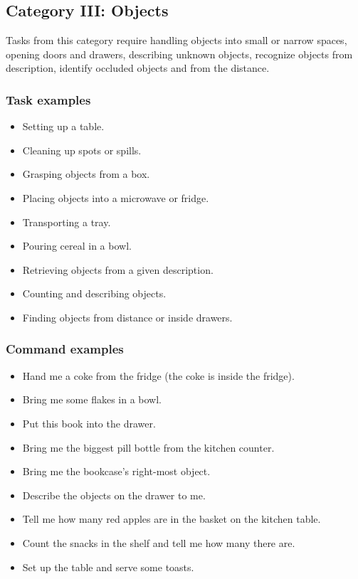 %
%
\subsection{Category III: Objects}
\label{sec:eegpsr-category3-explained}
Tasks from this category require handling objects into small or narrow spaces, opening doors and drawers, describing unknown objects, recognize objects from description, identify occluded objects and from the distance. 

\subsubsection{Task examples}
\begin{itemize}
	\item Setting up a table.
	\item Cleaning up spots or spills.
	\item Grasping objects from a box.
	\item Placing objects into a microwave or fridge.
	\item Transporting a tray.
	\item Pouring cereal in a bowl.
	\item Retrieving objects from a given description.
	\item Counting and describing objects.
	\item Finding objects from distance or inside drawers.
\end{itemize}

\subsubsection{Command examples}
\begin{itemize}
	\item Hand me a coke from the fridge (the coke is inside the fridge).
	\item Bring me some flakes in a bowl.
	\item Put this book into the drawer.
	\item Bring me the biggest pill bottle from the kitchen counter.
	\item Bring me the bookcase's right-most object.
	\item Describe the objects on the drawer to me.
	\item Tell me how many red apples are in the basket on the kitchen table.
	\item Count the snacks in the shelf and tell me how many there are.
	\item Set up the table and serve some toasts.
\end{itemize}




